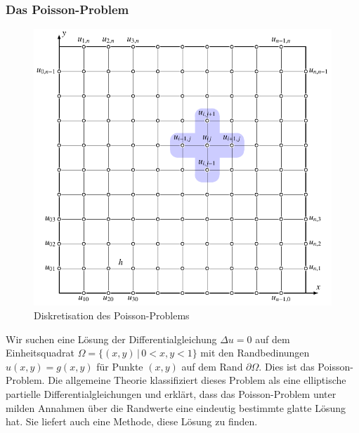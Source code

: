 \subsubsection{Das Poisson-Problem}
\begin{figure}
\centering
\includegraphics{chapters/2/poisson.pdf}
\caption{Diskretisation des Poisson-Problems
\label{skript:poisson:grid}}
\end{figure}
Wir suchen eine Lösung der Differentialgleichung
$\Delta u = 0$ auf dem Einheitsquadrat $\Omega=\{(x,y)\,|\, 0<x,y < 1\}$
mit den Randbedinungen $u(x,y)=g(x,y)$ für Punkte $(x,y)$ auf dem
Rand $\partial\Omega$.
%
Dies ist das Poisson-Problem.
Die allgemeine Theorie \cite{skript:pde} klassifiziert dieses Problem
als eine elliptische partielle Differentialgleichungen und erklärt,
dass das Poisson-Problem unter milden Annahmen über die Randwerte
eine eindeutig bestimmte glatte Lösung hat.
Sie liefert auch eine Methode, diese Lösung zu finden.

